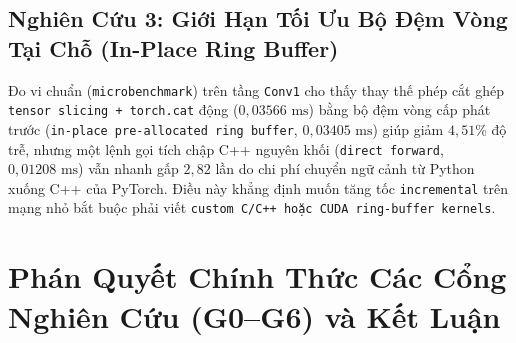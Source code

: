 \documentclass[11pt,a4paper]{article}
\newcommand{\code}[1]{{\small\ttfamily\nolinkurl{#1}}}
\theoremstyle{remark}
\begin{document}
\subsection{Nghiên Cứu 3: Giới Hạn Tối Ưu Bộ Đệm Vòng Tại Chỗ (In-Place Ring Buffer)}
Đo vi chuẩn (\code{microbenchmark}) trên tầng \code{Conv1} cho thấy thay thế phép cắt ghép \code{tensor slicing + torch.cat} động ($0,03566\text{ ms}$) bằng bộ đệm vòng cấp phát trước (\code{in-place pre-allocated ring buffer}, $0,03405\text{ ms}$) giúp giảm $4,51\%$ độ trễ, nhưng một lệnh gọi tích chập C++ nguyên khối (\code{direct forward}, $0,01208\text{ ms}$) vẫn nhanh gấp $2,82$ lần do chi phí chuyển ngữ cảnh từ Python xuống C++ của PyTorch. Điều này khẳng định muốn tăng tốc \code{incremental} trên mạng nhỏ bắt buộc phải viết \code{custom C/C++ hoặc CUDA ring-buffer kernels}.

\section{Phán Quyết Chính Thức Các Cổng Nghiên Cứu (G0--G6) và Kết Luận}
\end{document}
